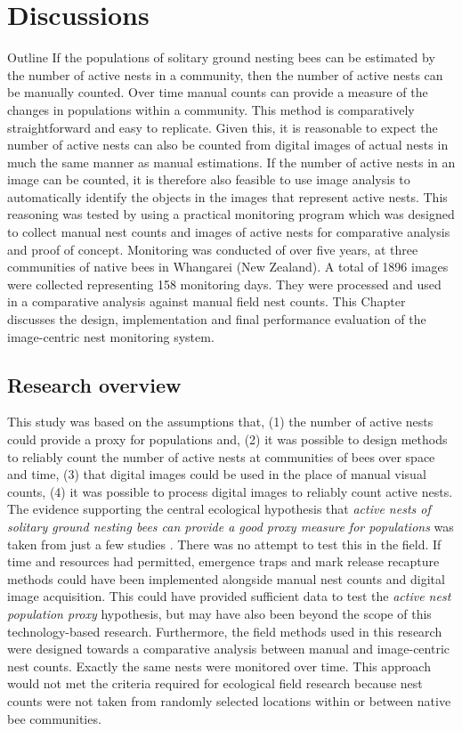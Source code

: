 \chapter{Discussions}\label{chp7:discussions}
\begin{remark}{Outline}
If the populations of solitary ground nesting bees can be estimated by the number of active nests in a community, then the number of active nests can be manually counted. Over time manual counts can provide a measure of the changes in populations within a community. This method is comparatively straightforward and easy to replicate. Given this, it is reasonable to expect the number of active nests can also be counted from digital images of actual nests in much the same manner as manual estimations. If the number of active nests in an image can be counted, it is therefore also feasible to use image analysis to automatically identify the objects in the images that represent active nests. This reasoning was tested by using a practical monitoring program which was designed to collect manual nest counts and images of active nests for comparative analysis and proof of concept. Monitoring was conducted of over five years, at three communities of native bees in Whangarei (New Zealand). A total of 1896 images were collected representing 158 monitoring days. They were processed and used in a comparative analysis against manual field nest counts. This Chapter discusses the design, implementation and final performance evaluation of the image-centric nest monitoring system.
\end{remark}

\section{Research overview}
This study was based on the assumptions that, (1) the number of active nests could provide a proxy for populations and, (2) it was possible to design methods to reliably count the number of active nests at communities of bees over space and time, (3) that digital images could be used in the place of manual visual counts, (4) it was possible to process digital images to reliably count active nests.  The evidence supporting the central ecological hypothesis that \emph{active nests of solitary ground nesting bees can provide a good proxy measure for populations} was taken from just a few studies \cite{Bischoff2003,Cane2008,Fellendorf2004}. There was no attempt to test this in the field. If time and resources had permitted, emergence traps and mark release recapture methods could have been implemented alongside manual nest counts and digital image acquisition. This could have provided sufficient data to test the \emph{active nest population proxy} hypothesis, but may have also been beyond the scope of this technology-based research. Furthermore, the field methods used in this research were designed towards a comparative analysis between manual and image-centric nest counts. Exactly the same nests were monitored over time. This approach would not met the criteria required for ecological field research because nest counts were not taken from randomly selected locations within or between native bee communities.

